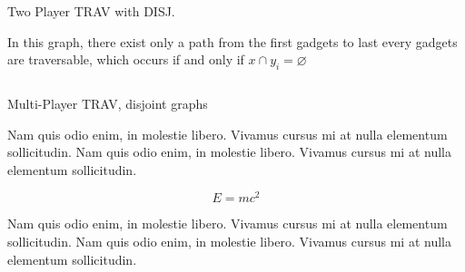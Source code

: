 \documentclass[final]{beamer}
\newlength{\onecolwid}
\newlength{\twocolwid}
\begin{document}
\begin{frame}[t]
\begin{columns}[t]
\begin{column}{\twocolwid}
\begin{columns}[t,totalwidth=\twocolwid]
\begin{column}{\onecolwid}
\begin{block}{Two Player TRAV with DISJ.}
\textbf{  }

In this graph, there exist only a path from the first gadgets to last every gadgets are traversable, which occurs if and only if $x\cap y_i =\varnothing$ 

\end{block}


\end{column} %

\end{columns} %


%
%
%

\begin{columns}[t,totalwidth=\twocolwid] %

\begin{column}{\onecolwid} %


\begin{block}{Multi-Player TRAV, disjoint graphs}

Nam quis odio enim, in molestie libero. Vivamus cursus mi at nulla elementum sollicitudin. Nam quis odio enim, in molestie libero. Vivamus cursus mi at nulla elementum sollicitudin.
  
\begin{equation}
E = mc^{2}
\label{eqn:Einstein}
\end{equation}

Nam quis odio enim, in molestie libero. Vivamus cursus mi at nulla elementum sollicitudin. Nam quis odio enim, in molestie libero. Vivamus cursus mi at nulla elementum sollicitudin.


\end{block}
\end{column}
\end{columns}
\end{column}
\end{columns}
\end{frame}
\end{document}
